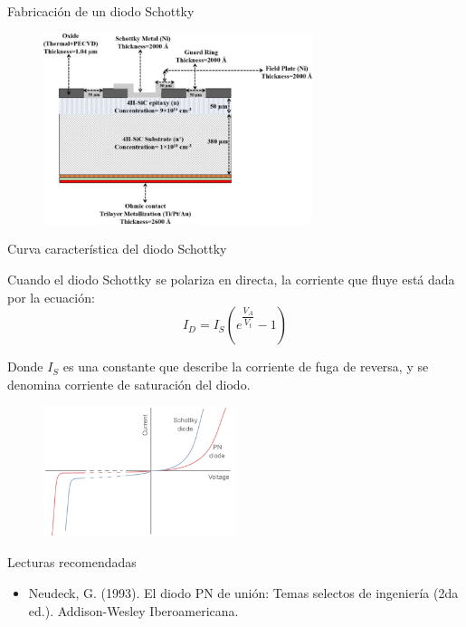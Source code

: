 \documentclass[10pt,t,aspectratio=169]{beamer}
\begin{document}
\begin{frame}{Fabricación de un diodo Schottky}

\begin{figure}[H]
    \centering
    \includegraphics[width=0.7\textwidth]{figures/schottky_fabricacion.png}
\end{figure}
    
\end{frame}


\begin{frame}{Curva característica del diodo Schottky}

Cuando el diodo Schottky se polariza en directa, la corriente que fluye está dada por la ecuación:
%
\[ I_D = I_S (e^{\dfrac{V_A}{V_t}} - 1) \]

Donde $I_S$ es una constante que describe la corriente de fuga de reversa, y se denomina corriente de saturación del diodo.

\begin{figure}[H]
    \centering
    \includegraphics[width=0.5\textwidth]{figures/schottky_curva_transferencia.pdf}
\end{figure}

    
\end{frame}



\begin{frame}{Lecturas recomendadas}

\begin{itemize}
    \item Neudeck, G. (1993). El diodo PN de unión: Temas selectos de ingeniería (2da ed.).  Addison-Wesley Iberoamericana.
\end{itemize}

\end{frame}
\end{document}

